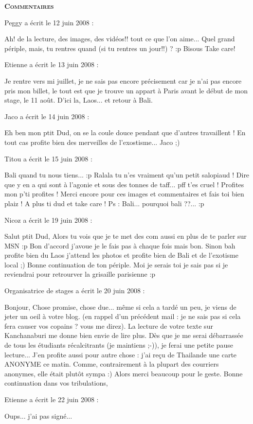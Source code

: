\bigskip
\textbf{\textsc{Commentaires}}

\medskip
Peggy a écrit le 12 juin 2008 :
\begin{displayquote}
Ah! de la lecture, des images, des vidéos!! tout ce que l'on aime...
Quel grand périple, mais, tu rentres quand (si tu rentres un jour!!) ? :p
Bisous
Take care!
\end{displayquote}

\medskip
Etienne a écrit le 13 juin 2008 :
\begin{displayquote}
Je rentre vers mi juillet, je ne sais pas encore précisement car je n'ai pas encore pris mon billet, le tout est que je trouve un appart à Paris avant le début de mon stage, le 11 août.
D'ici la, Laos... et retour à Bali.
\end{displayquote}

\medskip
Jaco a écrit le 14 juin 2008 :
\begin{displayquote}
Eh ben mon ptit Dud, on se la coule douce pendant que d'autres travaillent !
En tout cas profite bien des merveilles de l'exostisme...
Jaco ;)
\end{displayquote}

\medskip
Titou a écrit le 15 juin 2008 :
\begin{displayquote}
Bali quand tu nous tiens... :p
Ralala tu n'es vraiment qu'un petit salopiaud ! Dire que y en a qui sont à l'agonie et sous des tonnes de taff... pff t'es cruel !
Profites mon p'ti profites !
Merci encore pour ces images et commentaires et fais toi bien plaiz !
A plus ti dud et take care !
Ps : Bali... pourquoi bali ??... :p
\end{displayquote}

\medskip
Nicoz a écrit le 19 juin 2008 :
\begin{displayquote}
Salut ptit Dud,
Alors tu vois que je te met des com aussi en plus de te parler sur MSN :p
Bon d'accord j'avoue je le fais pas à chaque fois mais bon.
Sinon bah profite bien du Laos j'attend les photos et profite bien de Bali et de l'exotisme local ;)
Bonne continuation de ton périple.
Moi je serais toi je sais pas si je reviendrai pour retrourver la grisaille parisienne :p
\end{displayquote}

\medskip
Organisatrice de stages a écrit le 20 juin 2008 :
\begin{displayquote}
Bonjour,
Chose promise, chose due... même si cela a tardé un peu, je viens de jeter un oeil à votre blog. (en rappel d'un précédent mail : je ne sais pas si cela fera causer vos copains ? vous me direz).
La lecture de votre texte sur Kanchanaburi me donne bien envie de lire plus. Dès que je me serai débarrassée de tous les étudiants récalcitrants (je maintiens ;-)), je ferai une petite pause lecture...
J'en profite aussi pour autre chose : j'ai reçu de Thailande une carte ANONYME ce matin. Comme, contrairement à la plupart des courriers anonymes, elle était plutôt sympa :) Alors merci beaucoup pour le geste.
Bonne continuation dans vos tribulations,
\end{displayquote}

\medskip
Etienne a écrit le 22 juin 2008 :
\begin{displayquote}
Oups... j'ai pas signé...
\end{displayquote}

\vfill

